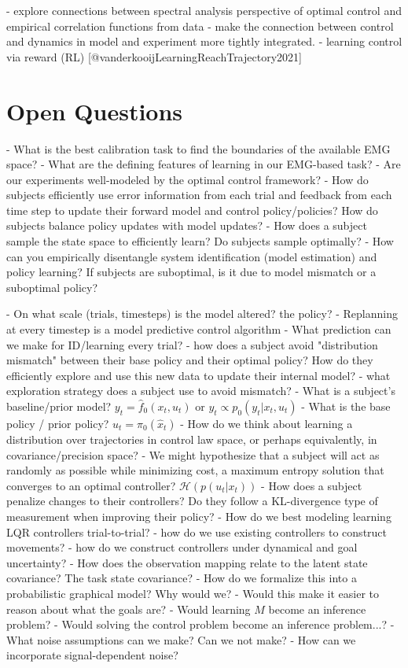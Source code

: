 \documentclass[../main.tex]{subfiles}
\begin{document}
 
- explore connections between spectral analysis perspective of optimal control and empirical correlation functions from data
- make the connection between control and dynamics in model and experiment more tightly integrated.  
- learning control via reward (RL) [@vanderkooijLearningReachTrajectory2021] 

\section{Open Questions}

- What is the best calibration task to find the boundaries of the available EMG space?
- What are the defining features of learning in our EMG-based task?
- Are our experiments well-modeled by the optimal control framework?
- How do subjects efficiently use error information from each trial and feedback from each time step to update their forward model and control policy/policies? How do subjects balance policy updates with model updates?
- How does a subject sample the state space to efficiently learn? Do subjects sample optimally?
- How can you empirically disentangle system identification (model estimation) and policy learning? If subjects are suboptimal, is it due to model mismatch or a suboptimal policy?
    
 - On what scale (trials, timesteps) is the model altered? the policy? 
 - Replanning at every timestep is a model predictive control algorithm 
 - What prediction can we make for ID/learning every trial? 
 - how does a subject avoid "distribution mismatch" between their base policy and their optimal policy? How do they efficiently explore and use this new data to update their internal model? 
 - what exploration strategy does a subject use to avoid mismatch? 
 - What is a subject's baseline/prior model? $y_{t} = \hat{f}_0(x_t,u_t)$ or $y_{t} \propto p_0(y_t|x_{t},u_t)$ 
 - What is the base policy / prior policy? $u_t = \pi_0(\hat{x}_t)$ 
 - How do we think about learning a distribution over trajectories in control law space, or perhaps equivalently, in covariance/precision space? 
 - We might hypothesize that a subject will act as randomly as possible while minimizing cost, a maximum entropy solution that converges to an optimal controller? $\mathcal{H}(p(u_t|x_t))$ 
 - How does a subject penalize changes to their controllers? Do they follow a KL-divergence type of measurement when improving their policy? 
 - How do we best modeling learning LQR controllers trial-to-trial? 
 - how do we use existing controllers to construct movements? 
 - how do we construct controllers under dynamical and goal uncertainty? 
 - How does the observation mapping relate to the latent state covariance? The task state covariance? 
 - How do we formalize this into a probabilistic graphical model? Why would we? 
 - Would this make it easier to reason about what the goals are? 
 - Would learning $M$ become an inference problem? 
 - Would solving the control problem become an inference problem...? 
 - What noise assumptions can we make? Can we not make? 
 - How can we incorporate signal-dependent noise? 
\end{document}
